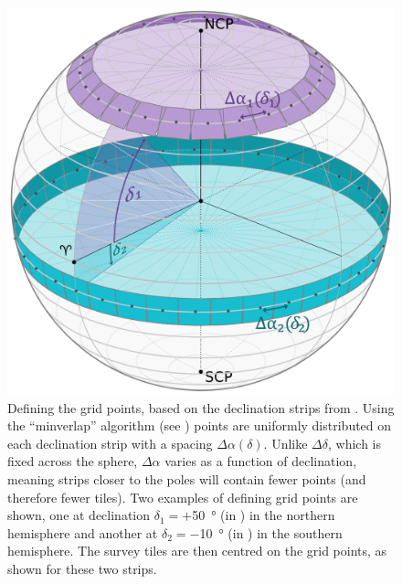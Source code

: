 \begin{colsection}
\begin{figure}[t]
    \begin{center}
        \includegraphics[width=\linewidth]{images/globe3.pdf}
    \end{center}
    \caption[Defining grid points]{
        Defining the grid points, based on the declination strips from . Using the ``minverlap'' algorithm (see ) points are uniformly distributed on each declination strip with a spacing $\Delta\alpha(\delta)$. Unlike $\Delta\delta$, which is fixed across the sphere, $\Delta\alpha$ varies as a function of declination, meaning strips closer to the poles will contain fewer points (and therefore fewer tiles). Two examples of defining grid points are shown, one at declination $\delta_1=+$\SI{50}{\degree} (in ) in the northern hemisphere and another at $\delta_2=-$\SI{10}{\degree} (in ) in the southern hemisphere. The survey tiles are then centred on the grid points, as shown for these two strips.
    }\label{fig:deltaalpha}
\end{figure}

\clearpage


\end{colsection}
